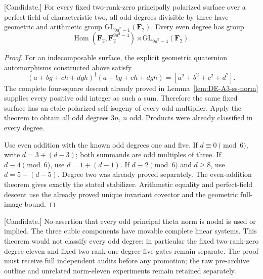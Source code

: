 \begin{corollary}
\label{cor:f0-all-even-nine-theta-transfer-candidate}
\textup{[Candidate.]}
For every fixed two-rank-zero principally polarized surface over
a perfect field of characteristic two, all odd degrees divisible
by three have geometric and arithmetic group
$\mathrm{GL}_{9d^2-1}(\mathbf F_2)$. Every even degree has group
\[
 \operatorname{Hom}(\mathbf F_2,\mathbf F_2^{9d^2-4})\rtimes
            \mathrm{GL}_{9d^2-4}(\mathbf F_2).
\]
\end{corollary}

\begin{proof}
For an indecomposable surface, the explicit geometric quaternion
automorphisms constructed above satisfy
\[
 (a+bg+ch+dgh)^\dagger(a+bg+ch+dgh)
                         =[a^2+b^2+c^2+d^2].
\]
The complete four-square descent already proved in
Lemma~\ref{lem:DE-A3-ss-norm} supplies every positive odd integer
as such a sum. Therefore the same fixed surface has an etale
polarized self-isogeny of every odd multiplier. Apply the theorem
to obtain all odd degrees $3n$, $n$ odd. Products were already
classified in every degree.

Use even addition with the known odd degrees one and five.
If $d\equiv0\pmod6$, write $d=3+(d-3)$; both summands are odd
multiples of three. If $d\equiv4\pmod6$, use $d=1+(d-1)$.
If $d\equiv2\pmod6$ and $d\ge8$, use $d=5+(d-5)$.
Degree two was already proved separately. The even-addition
theorem gives exactly the stated stabilizer. Arithmetic equality
and perfect-field descent use the already proved unique invariant
covector and the geometric full-image bound.
\end{proof}

\begin{remark}[Scope]
\label{rem:nine-theta-transfer-scope-candidate}
\textup{[Candidate.]}
No assertion that every odd principal theta norm is nodal is used
or implied. The three cubic components have movable complete
linear systems. This theorem would not classify every odd degree:
in particular the fixed two-rank-zero degree eleven and fixed
two-rank-one degree five gates remain separate. The proof must
receive full independent audits before any promotion; the raw
pre-archive outline and unrelated norm-eleven experiments remain
retained separately.
\end{remark}
